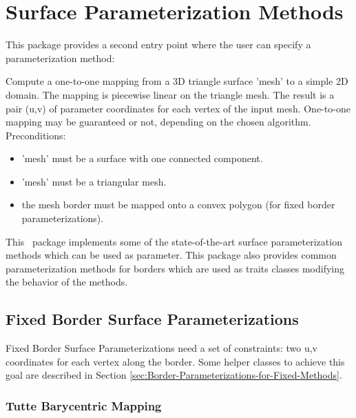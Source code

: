 \section{Surface Parameterization Methods}


This package provides a second  entry point
where the user can specify a parameterization method:

{
Compute a one-to-one mapping from a 3D triangle surface 'mesh' to a simple 2D domain. The mapping is piecewise linear on the triangle mesh. The result is a pair (u,v) of parameter coordinates for each vertex of the input mesh.
One-to-one mapping may be guaranteed or not, depending on the chosen  algorithm.
Preconditions:\begin{itemize}
\item 'mesh' must be a surface with one connected component.\item 'mesh' must be a triangular mesh.\item the mesh border must be mapped onto a convex polygon (for fixed border parameterizations).\end{itemize}
}


This \cgal\ package implements some of the state-of-the-art surface
parameterization methods which can be used as
 parameter. This package also provides common parameterization methods for
borders which are used as traits classes modifying the behavior of
the  methods.


\subsection{Fixed Border Surface Parameterizations}


Fixed Border Surface Parameterizations need a set of constraints: two
u,v coordinates for each vertex along the border. Some helper
classes to achieve this goal are described in Section
\ref{sec:Border-Parameterizations-for-Fixed-Methods}.

\subsubsection{Tutte Barycentric Mapping}

